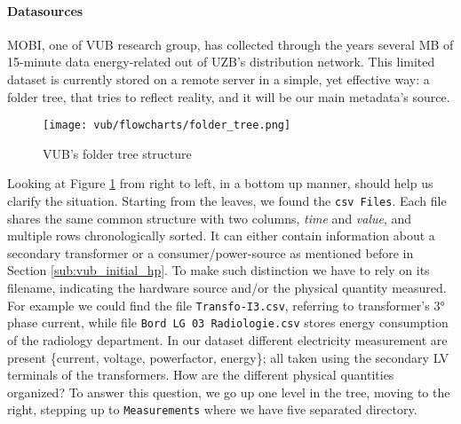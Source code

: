 \paragraph{Datasources}
MOBI, one of \ac{VUB} research group, has collected through the years several MB of 15-minute data energy-related out of \ac{UZB}'s distribution network.
This limited dataset is currently stored on a remote server in a simple, yet effective way: 
a folder tree, that tries to reflect reality, and it will be our main metadata's source. 

\begin{figure}[ht]
    \texttt{[image: vub/flowcharts/folder\_tree.png]}
    \caption{\ac{VUB}'s folder tree structure}
    \label{fig:vub_folder_tree}
\end{figure}
Looking at Figure \ref{fig:vub_folder_tree} from right to left, in a bottom up manner, should help us clarify the situation. %
Starting from the leaves, we found the \texttt{\ac{csv} Files}. Each file shares the same common structure with two columns, \textit{time} and \textit{value}, and multiple rows chronologically sorted.
It can either contain information about a secondary transformer or a consumer/power-source as mentioned before in Section \ref{sub:vub_initial_hp}. 
To make such distinction we have to rely on its filename, indicating the hardware source and/or the physical quantity measured.
For example we could find the file \texttt{Transfo-I3.csv}, referring to transformer's 3° phase current, while file \texttt{Bord LG 03 Radiologie.csv} stores energy consumption of the radiology department.
In our dataset different electricity measurement are present \{current, voltage, power\-factor, energy\}; all taken using the secondary \ac{LV} terminals of the transformers.
How are the different physical quantities organized? 
To answer this question, we go up one level in the tree, moving to the right, stepping up to \texttt{Measurements} where we have five separated directory.

